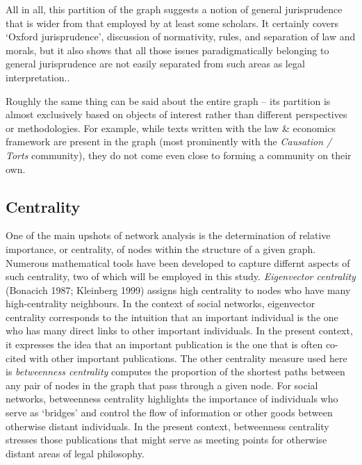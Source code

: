 \documentclass[
]{article}
\begin{document}
All in all, this partition of the graph suggests a notion of general jurisprudence that is wider from that employed by at least some scholars. It certainly covers `Oxford jurisprudence', discussion of normativity, rules, and separation of law and morals, but it also shows that all those issues paradigmatically belonging to general jurisprudence are not easily separated from such areas as legal interpretation..

Roughly the same thing can be said about the entire graph -- its partition is almost exclusively based on objects of interest rather than different perspectives or methodologies. For example, while texts written with the law \& economics framework are present in the graph (most prominently with the \emph{Causation / Torts} community), they do not come even close to forming a community on their own.

\hypertarget{centrality}{%
\subsection{Centrality}\label{centrality}}

One of the main upshots of network analysis is the determination of relative importance, or centrality, of nodes within the structure of a given graph. Numerous mathematical tools have been developed to capture differnt aspects of such centrality, two of which will be employed in this study. \emph{Eigenvector centrality} (Bonacich 1987; Kleinberg 1999) assigns high centrality to nodes who have many high-centrality neighbours. In the context of social networks, eigenvector centrality corresponds to the intuition that an important individual is the one who has many direct links to other important individuals. In the present context, it expresses the idea that an important publication is the one that is often co-cited with other important publications. The other centrality measure used here is \emph{betweenness centrality} computes the proportion of the shortest paths between any pair of nodes in the graph that pass through a given node. For social networks, betweenness centrality highlights the importance of individuals who serve as `bridges' and control the flow of information or other goods between otherwise distant individuals. In the present context, betweenness centrality stresses those publications that might serve as meeting points for otherwise distant areas of legal philosophy.
\end{document}
